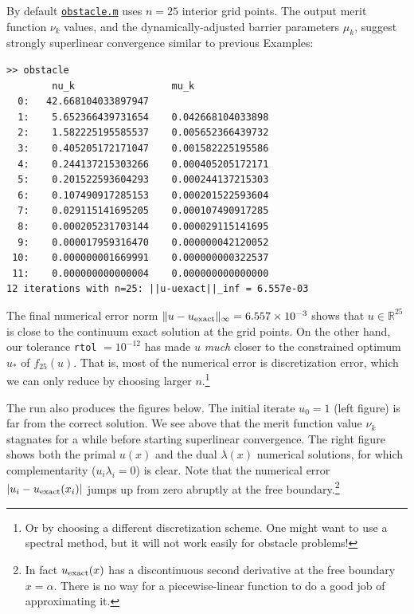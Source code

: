 \documentclass[11pt]{article}
\newcommand{\RR}{\mathbb{R}}
\begin{document}
By default \href{https://github.com/bueler/popdip/blob/main/matlab/obstacle.m}{\texttt{obstacle.m}} uses $n=25$ interior grid points.  The output merit function $\nu_k$ values, and the dynamically-adjusted barrier parameters $\mu_k$, suggest strongly superlinear convergence similar to previous Examples:
\begin{Verbatim}[fontsize=\footnotesize]
>> obstacle
        nu_k                 mu_k
  0:   42.668104033897947
  1:    5.652366439731654    0.042668104033898
  2:    1.582225195585537    0.005652366439732
  3:    0.405205172171047    0.001582225195586
  4:    0.244137215303266    0.000405205172171
  5:    0.201522593604293    0.000244137215303
  6:    0.107490917285153    0.000201522593604
  7:    0.029115141695205    0.000107490917285
  8:    0.000205231703144    0.000029115141695
  9:    0.000017959316470    0.000000042120052
 10:    0.000000001669991    0.000000000322537
 11:    0.000000000000004    0.000000000000000
12 iterations with n=25: ||u-uexact||_inf = 6.557e-03
\end{Verbatim}

The final numerical error norm $\|u-u_{\text{exact}}\|_\infty = 6.557 \times 10^{-3}$ shows that $u\in\RR^{25}$ is close to the continuum exact solution at the grid points.  On the other hand, our tolerance \texttt{rtol} $=10^{-12}$ has made $u$ \emph{much} closer to the constrained optimum $u_*$ of $f_{25}(u)$.  That is, most of the numerical error is discretization error, which we can only reduce by choosing larger $n$.\footnote{Or by choosing a different discretization scheme.  One might want to use a spectral method, but it will not work easily for obstacle problems!}

The run also produces the figures below.  The initial iterate $u_0=1$ (left figure) is far from the correct solution.  We see above that the merit function value $\nu_k$ stagnates for a while before starting superlinear convergence.  The right figure shows both the primal $u(x)$ and the dual $\lambda(x)$ numerical solutions, for which complementarity ($u_i \lambda_i=0$) is clear.  Note that the numerical error $|u_i-u_{\text{exact}}(x_i)|$ jumps up from zero abruptly at the free boundary.\footnote{In fact $u_{\text{exact}}(x)$ has a discontinuous second derivative at the free boundary $x=\alpha$.  There is no way for a piecewise-linear function to do a good job of approximating it.}
\end{document}
